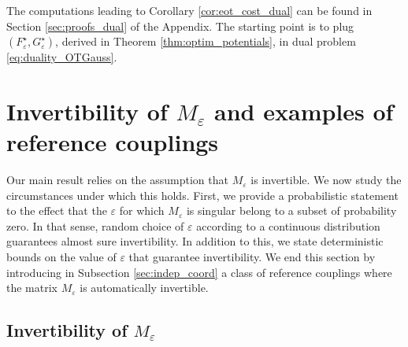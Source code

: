 \documentclass[]{article}
\numberwithin{equation}{section}
\theoremstyle{plain}
\begin{document}
The computations leading to Corollary \ref{cor:eot_cost_dual} can be found in Section \ref{sec:proofs_dual} of the Appendix. The starting point is to plug $(F_{\varepsilon}^{\star}, G_{\varepsilon}^{\star})$, derived in Theorem \ref{thm:optim_potentials}, in dual problem \eqref{eq:duality_OTGauss}.


\section{Invertibility of $M_{\varepsilon}$ and examples of reference couplings}\label{sec:examples}

Our main result relies on the assumption that $M_{\varepsilon}$ is invertible. We now study the circumstances under which this holds.
First, we provide a probabilistic statement to the effect that the $\varepsilon$ for which  $M_{\varepsilon}$ is singular belong to a subset of probability zero. In that sense, random choice of $\varepsilon$ according to a continuous distribution guarantees almost sure invertibility.	
In addition to this, we state deterministic bounds on the value of $\varepsilon$ that guarantee invertibility. We end this section by introducing in Subsection \ref{sec:indep_coord} a class of reference couplings where the matrix $M_{\varepsilon}$ is automatically invertible.

\subsection{Invertibility of $M_{\varepsilon}$}\label{sec:inv_meps}
\end{document}
